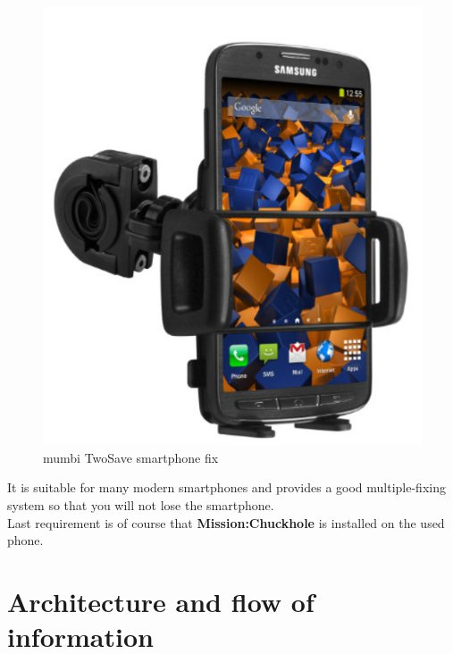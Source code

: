 \documentclass[10pt,a4paper]{article} %
\begin{document}
	\begin{figure}[H]
		\begin{center}
 		  \includegraphics[scale=0.3]{img/smartphone_fix.png}
		  \caption{mumbi TwoSave smartphone fix}
		  \label{fig:smartphone_fix}
		\end{center}
	\end{figure}

	It is suitable for many modern smartphones and provides a good multiple-fixing system so that you will not lose the smartphone.\\
	Last requirement is of course that \textbf{Mission:Chuckhole} is installed on the used phone.


    \section{Architecture and flow of information}
	
\end{document}
